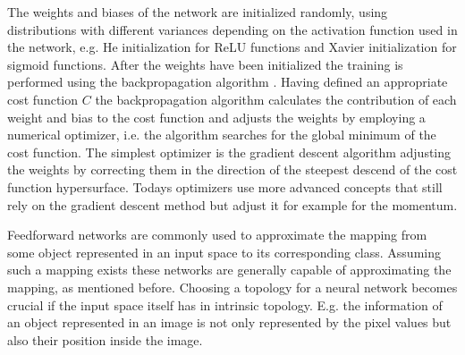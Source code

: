 The weights and biases of the network are initialized randomly, using distributions with different variances depending on the activation function used in the network, e.g. He initialization \cite{HeInitialization} for ReLU functions and Xavier initialization \cite{XavierInitialization} for sigmoid functions. After the weights have been initialized the training is performed using the backpropagation algorithm \cite{Backpropagation}. Having defined an appropriate cost function $C$ the backpropagation algorithm calculates the contribution of each weight and bias to the cost function and adjusts the weights by employing a numerical optimizer, i.e. the algorithm searches for the global minimum of the cost function. The simplest optimizer is the gradient descent algorithm adjusting the weights by correcting them in the direction of the steepest descend of the cost function hypersurface. Todays optimizers use more advanced concepts that still rely on the gradient descent method but adjust it for example for the momentum. 

Feedforward networks are commonly used to approximate the mapping from some object represented in an input space to its corresponding class. Assuming such a mapping exists these networks are generally capable of approximating the mapping, as mentioned before. %
 Choosing a topology for a neural network becomes crucial if the input space itself has in intrinsic topology. E.g. the information of an object represented in an image is not only represented by the pixel values but also their position inside the image.\\

